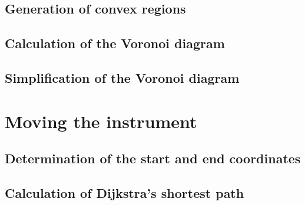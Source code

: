 \subsection{Generation of convex regions}


\subsection{Calculation of the Voronoi diagram}
\label{sec:voronoi}


\subsection{Simplification of the Voronoi diagram}







\section{Moving the instrument}
\label{sec:exepath}


\subsection{Determination of the start and end coordinates}



\subsection{Calculation of Dijkstra's shortest path}
\label{sec:dijkstra}



